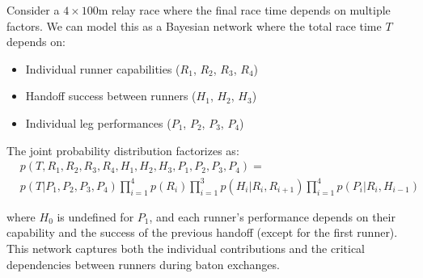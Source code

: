   \begin{example}
    Consider a $4\times100$m relay race where the final race time depends on multiple factors. We can model this as a Bayesian network where the total race time $T$ depends on:
    \begin{itemize}
      \item Individual runner capabilities ($R_1$, $R_2$, $R_3$, $R_4$)
      \item Handoff success between runners ($H_1$, $H_2$, $H_3$)
      \item Individual leg performances ($P_1$, $P_2$, $P_3$, $P_4$)
    \end{itemize}

    The joint probability distribution factorizes as:
    \begin{align*}
      & p(T, R_1, R_2, R_3, R_4, H_1, H_2, H_3, P_1, P_2, P_3, P_4) = \\
      & p(T|P_1,P_2,P_3,P_4) \prod_{i=1}^4 p(R_i) \prod_{i=1}^3 p(H_i|R_i,R_{i+1}) \prod_{i=1}^4 p(P_i|R_i,H_{i-1})
    \end{align*}

    \noindent where $H_0$ is undefined for $P_1$, and each runner's performance depends on their capability and the success of the previous handoff (except for the first runner). This network captures both the individual contributions and the critical dependencies between runners during baton exchanges.

    \begin{figure}[H]
      \centering 
\end{figure}
\end{example}
